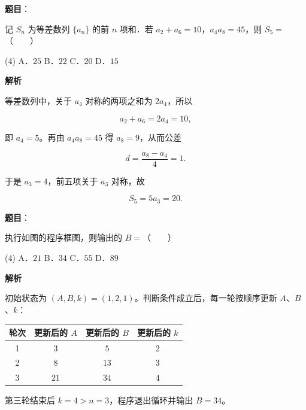 \begin{answer}

\textbf{题目}：

记 $S_n$ 为等差数列 $\{a_n\}$ 的前 $n$ 项和．若 $a_2+a_6=10$，$a_4a_8=45$，则 $S_5=$\mbox{（　　）}

\begin{gkopts}(4)
\task A．$25$
\task B．$22$
\task C．$20$
\task D．$15$
\end{gkopts}

\textbf{解析}

等差数列中，关于 $a_4$ 对称的两项之和为 $2a_4$，所以

\nopagebreak[4]
\[
a_2+a_6=2a_4=10,
\]

即 $a_4=5$。再由 $a_4a_8=45$ 得 $a_8=9$，从而公差

\nopagebreak[4]
\[
d=\frac{a_8-a_4}{4}=1.
\]

于是 $a_3=4$，前五项关于 $a_3$ 对称，故

\nopagebreak[4]
\[
S_5=5a_3=20.
\]


\end{answer}
\begin{answer}

\textbf{题目}：

执行如图的程序框图，则输出的 $B=$\mbox{（　　）}
\nopagebreak[4]
\begin{center}\end{center}
\nopagebreak[4]
\begin{gkopts}(4)
\task A．$21$
\task B．$34$
\task C．$55$
\task D．$89$
\end{gkopts}

\textbf{解析}

初始状态为 $(A,B,k)=(1,2,1)$。判断条件成立后，每一轮按顺序更新 $A$、$B$、$k$：

\begin{center}
\begin{tabular}{cccc}
\toprule
轮次 & 更新后的 $A$ & 更新后的 $B$ & 更新后的 $k$ \\
\midrule
1 & $3$ & $5$ & $2$ \\
2 & $8$ & $13$ & $3$ \\
3 & $21$ & $34$ & $4$ \\
\bottomrule
\end{tabular}
\end{center}

第三轮结束后 $k=4>n=3$，程序退出循环并输出 $B=34$。


\end{answer}
